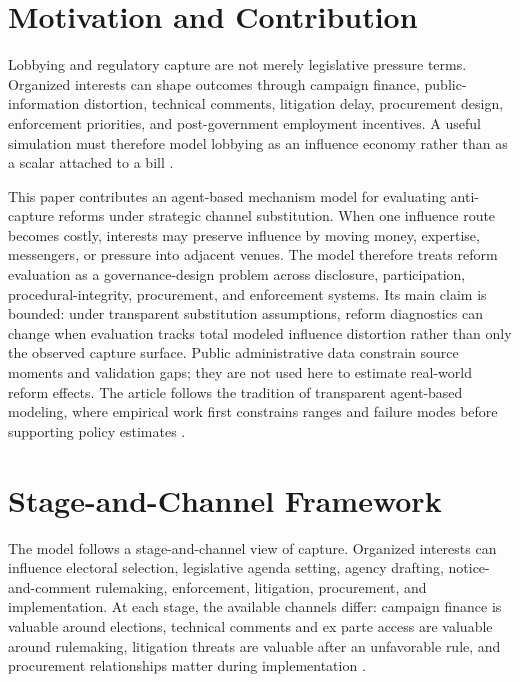 \section{Motivation and Contribution}

Lobbying and regulatory capture are not merely legislative pressure terms. Organized interests can shape outcomes through campaign finance, public-information distortion, technical comments, litigation delay, procurement design, enforcement priorities, and post-government employment incentives. A useful simulation must therefore model lobbying as an influence economy rather than as a scalar attached to a bill \citep{stigler1971economicRegulation,grossmanHelpman1994,hallDeardorff2006,baumgartner2009lobbying,dalbo2006capture,deFigueiredoRichter2014,bertrand2014whom,carpenterMoss2014}.

This paper contributes an agent-based mechanism model for evaluating anti-capture reforms under strategic channel substitution. When one influence route becomes costly, interests may preserve influence by moving money, expertise, messengers, or pressure into adjacent venues. The model therefore treats reform evaluation as a governance-design problem across disclosure, participation, procedural-integrity, procurement, and enforcement systems. Its main claim is bounded: under transparent substitution assumptions, reform diagnostics can change when evaluation tracks total modeled influence distortion rather than only the observed capture surface. Public administrative data constrain source moments and validation gaps; they are not used here to estimate real-world reform effects. The article follows the tradition of transparent agent-based modeling, where empirical work first constrains ranges and failure modes before supporting policy estimates \citep{epstein1999generative,windrum2007empirical,grimm2010odd}.

\section{Stage-and-Channel Framework}

The model follows a stage-and-channel view of capture. Organized interests can influence electoral selection, legislative agenda setting, agency drafting, notice-and-comment rulemaking, enforcement, litigation, procurement, and implementation. At each stage, the available channels differ: campaign finance is valuable around elections, technical comments and ex parte access are valuable around rulemaking, litigation threats are valuable after an unfavorable rule, and procurement relationships matter during implementation \citep{mccubbins1987administrative,golden1998rulemaking,west2004formal,yackeeYackee2006,gordonHafer2005,kallaBroockman2016,ansolabehere2003littleMoney,baumgartner2009lobbying}.

